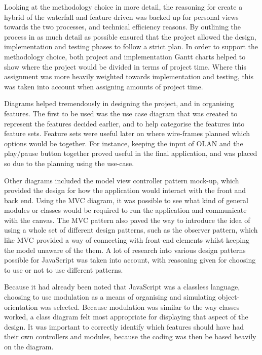 Looking at the methodology choice in more detail, the reasoning for create a hybrid of the waterfall and feature driven was backed up for personal views towards the two processes, and technical efficiency reasons. By outlining the process in as much detail as possible ensured that the project allowed the design, implementation and testing phases to follow a strict plan. In order to support the methodology choice, both project and implementation Gantt charts helped to show where the project would be divided in terms of project time. Where this assignment was more heavily weighted towards implementation and testing, this was taken into account when assigning amounts of project time.

Diagrams helped tremendously in designing the project, and in organising features. The first to be used was the use case diagram that was created to represent the features decided earlier, and to help categorise the features into feature sets. Feature sets were useful later on where wire-frames planned which options would be together. For instance, keeping the input of OLAN and the play/pause button together proved useful in the final application, and was placed so due to the planning using the use-case.

Other diagrams included the model view controller pattern mock-up, which provided the design for how the application would interact with the front and back end. Using the MVC diagram, it was possible to see what kind of general modules or classes would be required to run the application and communicate with the canvas. The MVC pattern also paved the way to introduce the idea of using a whole set of different design patterns, such as the observer pattern, which like MVC provided a way of connecting with front-end elements whilst keeping the model unaware of the them. A lot of research into various design patterns possible for JavaScript was taken into account, with reasoning given for choosing to use or not to use different patterns.

Because it had already been noted that JavaScript was a classless language, choosing to use modulation as a means of organising and simulating object-orientation was selected. Because modulation was similar to the way classes worked, a class diagram felt most appropriate for displaying that aspect of the design. It was important to correctly identify which features should have had their own controllers and modules, because the coding was then be based heavily on the diagram.

